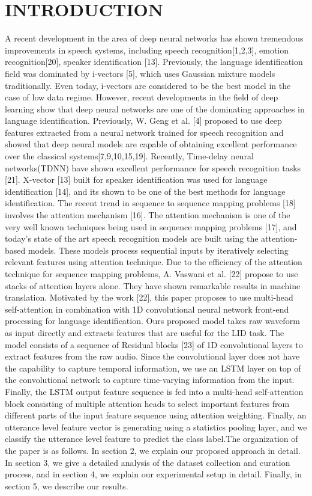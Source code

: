 \documentclass{article}
\begin{document}
\section{INTRODUCTION}
\label{sec:intro}
A recent development in the area of deep neural networks has shown tremendous improvements in speech systems, including speech recognition[1,2,3], emotion recognition[20], speaker identification [13]. Previously, the language identification field was dominated by i-vectors [5], which uses Gaussian mixture models traditionally. Even today, i-vectors are considered to be the best model in the case of low data regime. However, recent developments in the field of deep learning show that deep neural networks are one of the dominating approaches in language identification. Previously, W. Geng et al. [4] proposed to use deep features extracted from a neural network trained for speech recognition and showed that deep neural models are capable of obtaining excellent performance over the classical systems[7,9,10,15,19]. Recently, Time-delay neural networks(TDNN) have shown excellent performance for speech recognition tasks [21]. X-vector [13] built for speaker identification was used for language identification [14], and its shown to be one of the best methods for language identification. The recent trend in sequence to sequence mapping problems [18] involves the attention mechanism [16]. The attention mechanism is one of the very well known techniques being used in sequence mapping problems [17], and today's state of the art speech recognition models are built using the attention-based models. These models process sequential inputs by iteratively selecting relevant features using attention technique. Due to the efficiency of the attention technique for sequence mapping problems, A. Vaswani et al. [22] propose to use stacks of attention layers alone. They have shown remarkable results in machine translation.
Motivated by the work [22], this paper proposes to use multi-head self-attention in combination with 1D convolutional neural network front-end processing for language identification. Ours proposed model takes raw waveform as input directly and extracts features that are useful for the LID task. The model consists of a sequence of Residual blocks [23] of 1D convolutional layers to extract features from the raw audio. Since the convolutional layer does not have the capability to capture temporal information, we use an LSTM layer on top of the convolutional network to capture time-varying information from the input. Finally, the LSTM output feature sequence is fed into a multi-head self-attention block consisting of multiple attention heads to select important features from different parts of the input feature sequence using attention weighting. Finally, an utterance level feature vector is generating using a statistics pooling layer, and we classify the utterance level feature to predict the class label.The organization of the paper is as follows. In section 2, we explain our proposed approach in detail. In section 3, we give a detailed analysis of the dataset collection and curation process, and in section 4, we explain our experimental setup in detail. Finally, in section 5, we describe our results.
\end{document}
